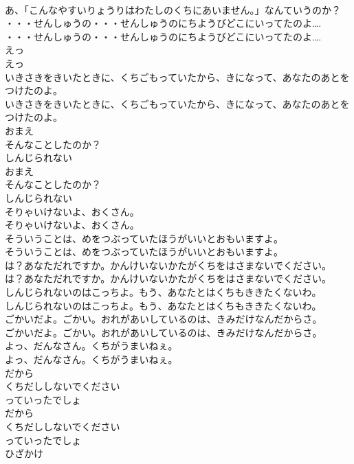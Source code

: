 \documentclass[8pt]{extreport}
\begin{document}
\begin{CJK}{UTF8}{min}
\\	あ、「こんなやすいりょうりはわたしのくちにあいません。」なんていうのか？
\\	・・・せんしゅうの・・・せんしゅうのにちようびどこにいってたのよ….
\\	・・・せんしゅうの・・・せんしゅうのにちようびどこにいってたのよ….
\\	えっ
\\	えっ
\\	いきさきをきいたときに、くちごもっていたから、きになって、あなたのあとをつけたのよ。
\\	いきさきをきいたときに、くちごもっていたから、きになって、あなたのあとをつけたのよ。
\\	おまえ
\\	そんなことしたのか？
\\	しんじられない
\\	おまえ
\\	そんなことしたのか？
\\	しんじられない
\\	そりゃいけないよ、おくさん。
\\	そりゃいけないよ、おくさん。
\\	そういうことは、めをつぶっていたほうがいいとおもいますよ。
\\	そういうことは、めをつぶっていたほうがいいとおもいますよ。
\\	は？あなただれですか。かんけいないかたがくちをはさまないでください。
\\	は？あなただれですか。かんけいないかたがくちをはさまないでください。
\\	しんじられないのはこっちよ。もう、あなたとはくちもききたくないわ。
\\	しんじられないのはこっちよ。もう、あなたとはくちもききたくないわ。
\\	ごかいだよ。ごかい。おれがあいしているのは、きみだけなんだからさ。
\\	ごかいだよ。ごかい。おれがあいしているのは、きみだけなんだからさ。
\\	よっ、だんなさん。くちがうまいねぇ。
\\	よっ、だんなさん。くちがうまいねぇ。
\\	だから
\\	くちだししないでください
\\	っていったでしょ
\\	だから
\\	くちだししないでください
\\	っていったでしょ
\\	ひざかけ

\end{CJK}
\end{document}
